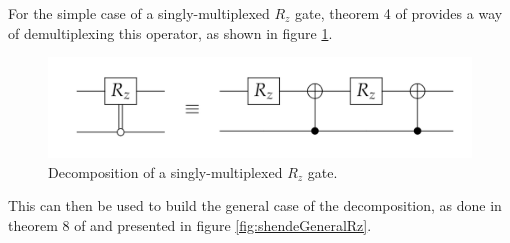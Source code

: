 \documentclass[../../../dissertation.tex]{subfiles}
\begin{document}
For the simple case of a singly-multiplexed $R_z$ gate, theorem 4 of
\cite{shende06} provides a way of demultiplexing this operator, as shown in
figure \ref{fig:shendeSingleRz}.
\begin{figure}[!h]
	\centering
	\includegraphics[scale=0.35]{img/QCircuit/diagonal/qcSingDecomp.png}
	\caption{Decomposition of a singly-multiplexed $R_z$ gate.} 
	\label{fig:shendeSingleRz}
\end{figure}
This can then be used to build the general case of the decomposition, as done in theorem
8 of \cite{shende06} and presented in figure \ref{fig:shendeGeneralRz}.
\end{document}
